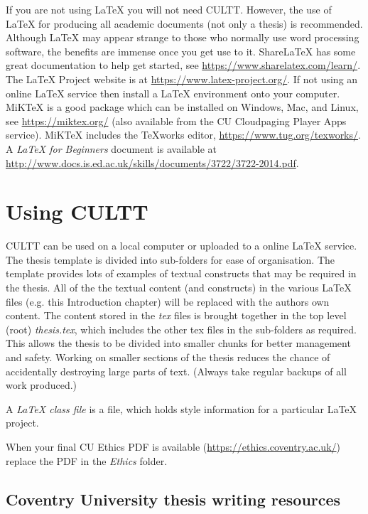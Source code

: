 If you are not using \LaTeX{} you will not need CULTT. However, the use of \LaTeX{} for producing all academic documents (not only a thesis) is recommended. Although \LaTeX{} may appear strange to those who normally use word processing software, the benefits are immense once you get use to it. ShareLaTeX has some great documentation to help get started, see \url{https://www.sharelatex.com/learn/}. The \LaTeX{} Project website is at \url{https://www.latex-project.org/}. If not using an online \LaTeX{} service then install a \LaTeX{} environment onto your computer. MiKTeX is a good package which can be installed on Windows, Mac, and Linux, see \url{https://miktex.org/} (also available from the CU Cloudpaging Player Apps service). MiKTeX includes the TeXworks editor, \url{https://www.tug.org/texworks/}. A \emph{\LaTeX{} for Beginners} document is available at \url{http://www.docs.is.ed.ac.uk/skills/documents/3722/3722-2014.pdf}.

\section{Using CULTT} %

CULTT can be used on a local computer or uploaded to a online \LaTeX{} service. The thesis template is divided into sub-folders for ease of organisation. The template provides lots of examples of textual constructs that may be required in the thesis. All of the the textual content (and constructs) in the various \LaTeX{} files (e.g. this Introduction chapter) will be replaced with the authors own content. The content stored in the \emph{tex} files is brought together in the top level (root) \emph{thesis.tex}, which includes the other tex files in the sub-folders as required. This allows the thesis to be divided into smaller chunks for better management and safety. Working on smaller sections of the thesis reduces the chance of accidentally destroying large parts of text. (Always take regular backups of all work produced.)

A \emph{\LaTeX{} class file} is a file, which holds style information for a particular \LaTeX{} project.

When your final CU Ethics PDF is available (\url{https://ethics.coventry.ac.uk/}) replace the PDF in the \emph{Ethics} folder.

\subsection{Coventry University thesis writing resources}

